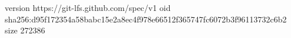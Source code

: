 version https://git-lfs.github.com/spec/v1
oid sha256:d95f172354a58babc15e2a8ec4f978e66512f365747fc6072b3f96113732c6b2
size 272386
